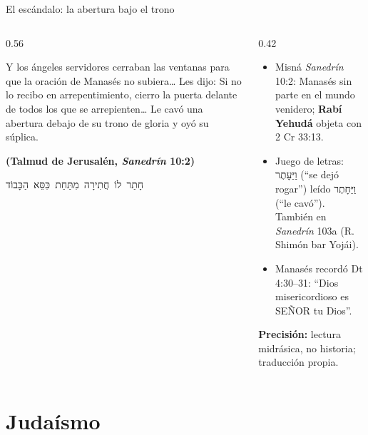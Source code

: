\documentclass[hyperref={bookmarks=false},aspectratio=169]{beamer}
\newcommand{\heb}[1]{\mbox{\foreignlanguage{hebrew}{#1}}}
\newcommand{\SENOR}{S{\fontsize{0.78em}{1em}\selectfont EÑOR}}
\newcommand{\fuente}[1]{\par\hfill{\upshape\bfseries\footnotesize\textcolor{azul}{#1}}}
\newcommand{\destacar}[1]{\textbf{\textcolor{azul}{#1}}}
\newcommand{\precision}[1]{{\footnotesize\color{gris}\textbf{Precisión:} #1}}
\begin{document}
\begin{frame}{El escándalo: la abertura bajo el trono}
\begin{columns}[t,onlytextwidth]
\begin{column}{0.56\textwidth}
\begin{cita}Y los ángeles servidores cerraban las ventanas para que la oración de Manasés no subiera\ldots{} Les dijo: Si no lo recibo en arrepentimiento, cierro la puerta delante de todos los que se arrepienten\ldots{} Le cavó una abertura debajo de su trono de gloria y oyó su súplica.\fuente{(Talmud de Jerusalén, \emph{Sanedrín} 10:2)}\end{cita}
\centering\heb{חָתַר לוֹ חֲתִירָה מִתַּחַת כִּסֵּא הַכָּבוֹד}
\end{column}
\begin{column}{0.42\textwidth}\scriptsize\RaggedRight
\begin{itemize}
\item Misná \emph{Sanedrín} 10:2: Manasés sin parte en el mundo venidero; \destacar{Rabí Yehudá} objeta con 2 Cr 33:13.
\item Juego de letras: \heb{וַיֵּעָתֶר} (``se dejó rogar'') leído \heb{וַיֵּחָתֶר} (``le cavó''). También en \emph{Sanedrín} 103a (R. Shimón bar Yojái).
\item Manasés recordó Dt 4:30--31: ``Dios misericordioso es \SENOR{} tu Dios''.
\end{itemize}
\precision{lectura midrásica, no historia; traducción propia.}
\end{column}
\end{columns}
\end{frame}

\section{Judaísmo}
\end{document}
